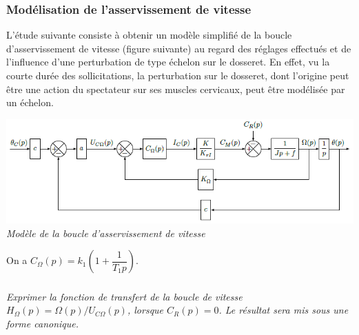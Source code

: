 \documentclass[10pt,fleqn]{article} %
\begin{document}
\begin{multicols}{2}
%
%
%
%
%
%
%
%


\subsubsection*{Modélisation de l'asservissement de vitesse}

L'étude suivante consiste à obtenir un modèle simplifié de la boucle
d'asservissement de vitesse (figure suivante) au regard des réglages effectués
et de l'influence d'une perturbation de type échelon sur le dosseret. En
effet, vu la courte durée des sollicitations, la perturbation sur le
dosseret, dont l'origine peut être une action du spectateur sur ses
muscles cervicaux, peut être modélisée par un échelon.

\begin{center}
\includegraphics[width=1.0\linewidth]{images/image14.png}
\textit{Modèle de la boucle d'asservissement de vitesse \label{fig13}}
\end{center}

 On a \(C_{\Omega}\left( p \right) = k_{1}\left( 1 + \dfrac{1}{T_{1}p} \right)\).
 

\subparagraph{}\textit{Exprimer la fonction de transfert de la boucle de vitesse
  \(H_{\Omega}\left( p \right) = \Omega(p)/U_{C\Omega}(p)\), lorsque
  \(C_{R}\left( p \right) = 0\). Le résultat sera mis sous une forme canonique.}


\end{multicols}
\end{document}
